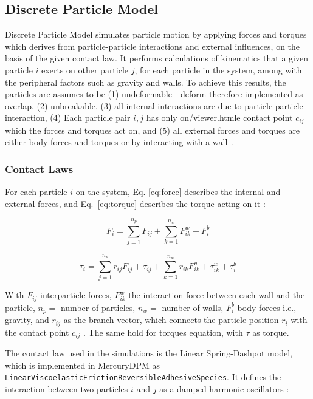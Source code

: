
 \subsection{Discrete Particle Model}
 Discrete Particle Model simulates particle motion by applying forces and torques which derives from particle-particle interactions and external influences, on the basis of the given contact law. It performs calculations of kinematics that a given particle $i$ exerts on other particle $j$, for each particle in the system, among with the peripheral factors such as gravity and walls. To achieve this results, the particles are assumes to be (1) undeformable - deform therefore implemented as overlap, (2) unbreakable, (3) all internal interactions are due to particle-particle interaction, (4) Each particle pair $i, j$ has only on/viewer.htmle contact point $c_{ij}$ which the forces and torques act on, and (5) all external forces and torques are either body forces and torques or by interacting with a wall~\cite{MercuryDPM}. 

\subsubsection{Contact Laws}
For each particle $i$ on the system, Eq. \ref{eq:force} describes the internal and external forces, and Eq.~\ref{eq:torque} describes the torque acting on it \cite{MercuryDPM}:

\begin{equation} \label{eq:force}
    F_i = \sum_{j=1}^{n_p} F_{ij} + \sum_{k=1}^{n_w} F_{ik}^w  + F_i^b
\end{equation}

\begin{equation} \label{eq:torque}
    \tau_i = \sum_{j=1}^{n_p} r_{ij}F_{ij} + \tau_{ij} + \sum_{k=1}^{n_w} r_{ik}F_{ik}^w + \tau_{ik}^w +\tau_{i}^{b} 
\end{equation}

With $F_{ij}$ interparticle forces, $F_{ik}^w$ the interaction force between each wall and the particle, $n_p =$ number of particles, $n_w =$ number of walls, $F_i^b$ body forces i.e., gravity, and $r_{ij}$ as the branch vector, which connects the particle position $r_i$ with the contact point $c_{ij}$ . The same hold for torques equation, with $\tau$ as torque. 

The contact law used in the simulations is the Linear Spring-Dashpot model, which is implemented in MercuryDPM as 
\texttt{LinearViscoelasticFrictionReversibleAdhesiveSpecies}. It defines the interaction between two particles $i$ and $j$ as a damped harmonic oscillators \cite{LSD-info}:

